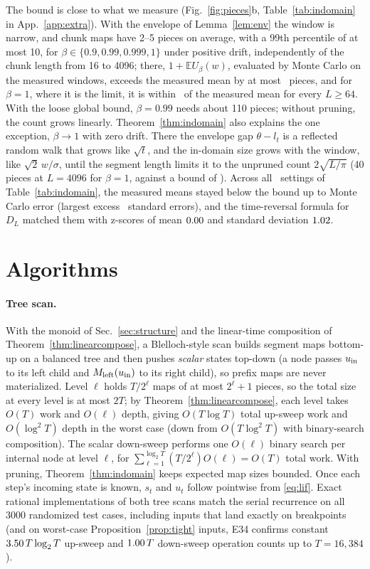 \documentclass[10pt]{article}
\newcounter{algo}
\theoremstyle{remark}
\begin{document}
The bound is close to what we measure (Fig.~\ref{fig:pieces}b, Table~\ref{tab:indomain} in App.~\ref{app:extra}). With the envelope of Lemma~\ref{lem:env} the window is narrow, and chunk maps have 2--5 pieces on average, with a 99th percentile of at most 10, for $\beta\in\{0.9,0.99,0.999,1\}$ under positive drift, independently of the chunk length from 16 to 4096; there, $1+\mathbb EU_\beta(w)$, evaluated by Monte Carlo on the measured windows, exceeds the measured mean by at most \InDomGapPos\ pieces, and for $\beta=1$, where it is the limit, it is within \InDomGapOne\ of the measured mean for every $L\ge64$. With the loose global bound, $\beta=0.99$ needs about 110 pieces; without pruning, the count grows linearly. Theorem~\ref{thm:indomain} also explains the one exception, $\beta\to1$ with zero drift. There the envelope gap $\theta-l_t$ is a reflected random walk that grows like $\sqrt t$, and the in-domain size grows with the window, like $\sqrt2\,w/\sigma$, until the segment length limits it to the unpruned count $2\sqrt{L/\pi}$ (40 pieces at $L=4096$ for $\beta=1$, against a bound of \InDomZeroBound). Across all \InDomCells\ settings of Table~\ref{tab:indomain}, the measured means stayed below the bound up to Monte Carlo error (largest excess \InDomMaxZ\ standard errors), and the time-reversal formula for $D_L$ matched them with z-scores of mean $0.00$ and standard deviation $1.02$.

\section{Algorithms}
\label{sec:algo}

\paragraph{Tree scan.}
With the monoid of Sec.~\ref{sec:structure} and the linear-time composition of Theorem~\ref{thm:linearcompose}, a Blelloch-style scan builds segment maps bottom-up on a balanced tree and then pushes \emph{scalar} states top-down (a node passes $u_{\rm in}$ to its left child and $M_{\rm left}(u_{\rm in})$ to its right child), so prefix maps are never materialized. Level $\ell$ holds $T/2^\ell$ maps of at most $2^\ell+1$ pieces, so the total size at every level is at most $2T$; by Theorem~\ref{thm:linearcompose}, each level takes $O(T)$ work and $O(\ell)$ depth, giving $O(T\log T)$ total up-sweep work and $O(\log^2T)$ depth in the worst case (down from $O(T\log^2T)$ with binary-search composition). The scalar down-sweep performs one $O(\ell)$ binary search per internal node at level $\ell$, for $\sum_{\ell=1}^{\log_2T}(T/2^\ell)O(\ell)=O(T)$ total work. With pruning, Theorem~\ref{thm:indomain} keeps expected map sizes bounded. Once each step's incoming state is known, $s_t$ and $u_t$ follow pointwise from \eqref{eq:lif}. Exact rational implementations of both tree scans match the serial recurrence on all 3000 randomized test cases, including inputs that land exactly on breakpoints (and on worst-case Proposition~\ref{prop:tight} inputs, E34 confirms constant $3.50\,T\log_2T$ up-sweep and $1.00\,T$ down-sweep operation counts up to $T=16{,}384$).
\end{document}
